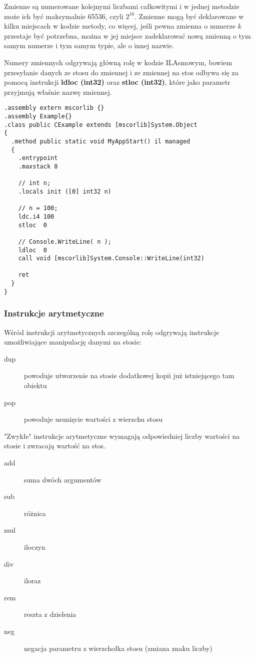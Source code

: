 Zmienne są numerowane kolejnymi liczbami całkowitymi i w jednej metodzie może ich być maksymalnie
65536, czyli $2^{16}$. Zmienne mogą być deklarowane w kilku miejscach w kodzie metody, co więcej, 
jeśli pewna zmienna o numerze $k$ przestaje być potrzebna, można w jej miejsce zadeklarować
nową zmienną o tym samym numerze i tym samym typie, ale o innej nazwie. 

Numery zmiennych odgrywają główną rolę w kodzie ILAsmowym, bowiem przesyłanie danych ze stosu
do zmiennej i ze zmiennej na stos odbywa się za pomocą instrukcji {\bf ldloc (int32)} oraz
{\bf stloc (int32)}, które jako parametr przyjmują właśnie nazwę zmiennej.

\begin{scriptsize}
\begin{verbatim}
.assembly extern mscorlib {}
.assembly Example{} 
.class public CExample extends [mscorlib]System.Object
{ 
  .method public static void MyAppStart() il managed 
  { 
    .entrypoint 
    .maxstack 8

    // int n;
    .locals init ([0] int32 n)

    // n = 100;
    ldc.i4 100
    stloc  0

    // Console.WriteLine( n );
    ldloc  0
    call void [mscorlib]System.Console::WriteLine(int32)
    
    ret 
  } 
}
\end{verbatim}
\end{scriptsize}

\subsubsection{Instrukcje arytmetyczne}

Wśród instrukcji arytmetycznych szczególną rolę odgrywają instrukcje umożliwiające manipulację
danymi na stosie:
\begin{description}
\item [dup] powoduje utworzenie na stosie dodatkowej kopii już istniejącego tam obiektu
\item [pop] powoduje usunięcie wartości z wierzchu stosu
\end{description}

"Zwykłe" instrukcje arytmetyczne wymagają odpowiedniej liczby wartości na stosie i zwracają 
wartość na stos.
\begin{description}
\item [add] suma dwóch argumentów 
\item [sub] różnica
\item [mul] iloczyn
\item [div] iloraz
\item [rem] reszta z dzielenia
\item [neg] negacja parametru z wierzchołka stosu (zmiana znaku liczby)
\end{description}


